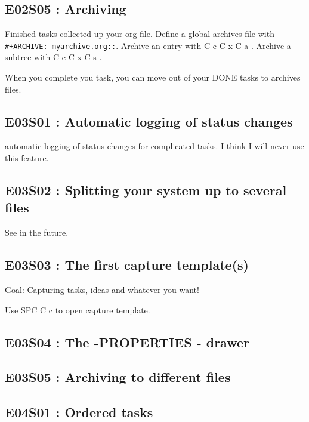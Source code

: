 \documentclass[11pt]{article}
\begin{document}
\subsection{E02S05 : Archiving}
\label{sec:orge1169f5}
Finished tasks collected up your org file. Define a global archives file with
\texttt{\#+ARCHIVE: myarchive.org::}. Archive an entry with  C-c C-x
C-a  . Archive a subtree with  C-c C-x C-s  .

When you complete you task, you can move out of your DONE tasks to archives files.

\subsection{E03S01 : Automatic logging of status changes}
\label{sec:orgc230ca6}
automatic logging of status changes for complicated tasks. I think I will
never use this feature.
\subsection{E03S02 : Splitting your system up to several files}
\label{sec:org505acad}
See in the future.
\subsection{E03S03 : The first capture template(s)}
\label{sec:org7db309d}
Goal: Capturing tasks, ideas and whatever you want!

Use  SPC C c  to open capture template.
\subsection{E03S04 : The  -PROPERTIES - drawer}
\label{sec:org3534d07}
\subsection{E03S05 : Archiving to different files}
\label{sec:org13a5f26}
\subsection{E04S01 : Ordered tasks}
\label{sec:orgada7f90}
\end{document}
